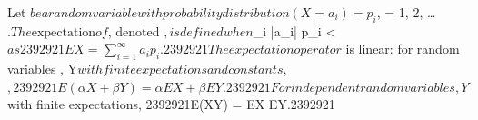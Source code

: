 Let $ be a random variable with probability distribution (X = a_i) = p_i$,  = 1, 2, \ldots$. The \text{expectation} of $, denoted $, is defined when $\sum_i |a_i| p_i < \infty$ as
2392921EX = \sum_{i=1}^{\infty} a_i p_i.2392921
The expectation operator $ is linear: for random variables , Y$ with finite expectations and constants $\alpha, \beta$,
2392921E(\alpha X + \beta Y) = \alpha EX + \beta EY.2392921
For independent random variables , Y$ with finite expectations,
2392921E(XY) = EX \cdot EY.2392921
